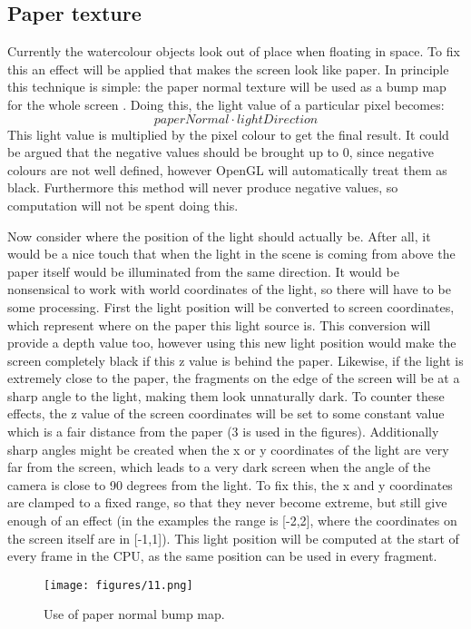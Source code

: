 \documentclass[a4paper, 12pt]{article}
\begin{document}
\subsection{Paper texture}
Currently the watercolour objects look out of place when floating in space. To fix this an effect will be applied that makes the screen look like paper. In principle this technique is simple: the paper normal texture will be used as a bump map for the whole screen \cite{Hoare2012}. Doing this, the light value of a particular pixel becomes:
$$\mathit{paperNormal} \cdot \mathit{lightDirection}$$
This light value is multiplied by the pixel colour to get the final result. It could be argued that the negative values should be brought up to 0, since negative colours are not well defined, however OpenGL will automatically treat them as black. Furthermore this method will never produce negative values, so computation will not be spent doing this.

Now consider where the position of the light should actually be. After all, it would be a nice touch that when the light in the scene is coming from above the paper itself would be illuminated from the same direction. It would be nonsensical to work with world coordinates of the light, so there will have to be some processing. First the light position will be converted to screen coordinates, which represent where on the paper this light source is. This conversion will provide a depth value too, however using this new light position would make the screen completely black if this z value is behind the paper. Likewise, if the light is extremely close to the paper, the fragments on the edge of the screen will be at a sharp angle to the light, making them look unnaturally dark. To counter these effects, the z value of the screen coordinates will be set to some constant value which is a fair distance from the paper (3 is used in the figures). Additionally sharp angles might be created when the x or y coordinates of the light are very far from the screen, which leads to a very dark screen when the angle of the camera is close to 90 degrees from the light. To fix this, the x and y coordinates are clamped to a fixed range, so that they never become extreme, but still give enough of an effect (in the examples the range is [-2,2], where the coordinates on the screen itself are in [-1,1]). This light position will be computed at the start of every frame in the CPU, as the same position can be used in every fragment.

\begin{figure}
  \centering
  \texttt{[image: figures/11.png]}
  \caption{Use of paper normal bump map.}
\end{figure}
\end{document}
